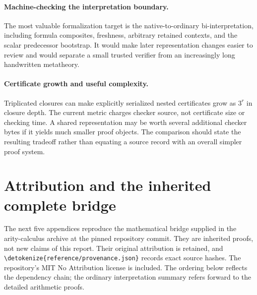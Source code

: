 \documentclass[11pt,letterpaper]{article}
\theoremstyle{definition}\newtheorem{definition}[theorem]{Definition}
\theoremstyle{remark}\newtheorem{remark}[theorem]{Remark}
\newcommand{\file}[1]{\expandafter\nolinkurl\expandafter{\detokenize{#1}}}
\begin{document}
\paragraph{Machine-checking the interpretation boundary.}
The most valuable formalization target is the native-to-ordinary
bi-interpretation, including formula composites, freshness, arbitrary
retained contexts, and the scalar predecessor bootstrap. It would make
later representation changes easier to review and would separate a small
trusted verifier from an increasingly long handwritten metatheory.

\paragraph{Certificate growth and useful complexity.}
Triplicated closures can make explicitly serialized nested certificates
grow as $3^r$ in closure depth. The current metric charges checker source,
not certificate size or checking time. A shared representation may be
worth several additional checker bytes if it yields much smaller proof
objects. The comparison should state the resulting tradeoff rather than
equating a source record with an overall simpler proof system.

\clearpage
\appendix
\section*{Attribution and the inherited complete bridge}

The next five appendices reproduce the mathematical bridge supplied in
the arity-calculus archive at the pinned repository commit. They are
inherited proofs, not new claims of this report. Their original attribution
is retained, and \file{reference/provenance.json} records exact source
hashes. The repository's MIT No Attribution license is included.
The ordering below reflects the dependency chain; the ordinary
interpretation summary refers forward to the detailed arithmetic proofs.






\end{document}
